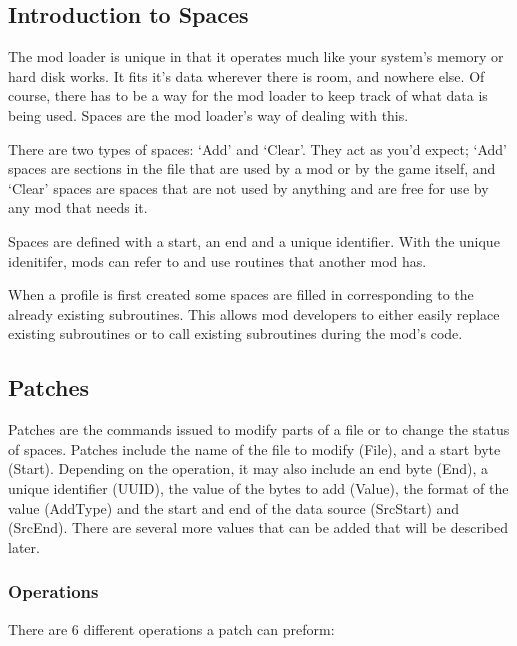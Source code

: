 \documentclass[12pt,a4paper,notitlepage]{article}
\begin{document}
\subsection{Introduction to Spaces}
\label{subsec:works-spaces}
The mod loader is unique in that it operates much like your system's memory or hard disk works. It fits it's data wherever there is room, and nowhere else. Of course, there has to be a way for the mod loader to keep track of what data is being used. Spaces are the mod loader's way of dealing with this.

There are two types of spaces: `Add' and `Clear'. They act as you'd expect; `Add' spaces are sections in the file that are used by a mod or by the game itself, and `Clear' spaces are spaces that are not used by anything and are free for use by any mod that needs it. 

Spaces are defined with a start, an end and a unique identifier. With the unique idenitifer, mods can refer to and use routines that another mod has.

When a profile is first created some spaces are filled in corresponding to the already existing subroutines. This allows mod developers to either easily replace existing subroutines or to call existing subroutines during the mod's code.

\subsection{Patches}
\label{subsec:works-patch}
Patches are the commands issued to modify parts of a file or to change the status of spaces. Patches include the name of the file to modify (File), and a start byte (Start). Depending on the operation, it may also include an end byte (End), a unique identifier (UUID), the value of the bytes to add (Value), the format of the value (AddType) and the start and end of the data source (SrcStart) and (SrcEnd). There are several more values that can be added that will be described later.

\subsubsection{Operations}
\label{subsubsec:works-patch-op}
There are 6 different operations a patch can preform: 
 
\end{document}
